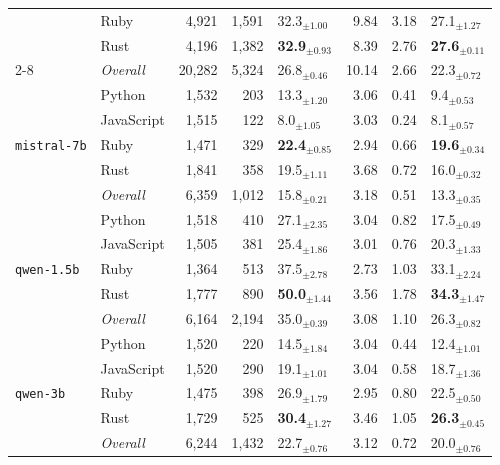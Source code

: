 \begin{longtable}{@{}llrrp{0.72cm}rrp{0.72cm}@{}}
       & Ruby & 4,921 & 1,591 & 32.3$_{\pm 1.00}$ & 9.84 & 3.18 & 27.1$_{\pm 1.27}$ \\
       & Rust & 4,196 & 1,382 & \textbf{32.9$_{\pm 0.93}$} & 8.39 & 2.76 & \textbf{27.6$_{\pm 0.11}$} \\ \cmidrule(lr){2-8}
      & \textit{Overall} & 20,282 & 5,324 & 26.8$_{\pm 0.46}$ & 10.14 & 2.66 & 22.3$_{\pm 0.72}$ \\
    \midrule
      \multirow{5}{*}{\texttt{mistral-7b}} & Python & 1,532 & 203 & 13.3$_{\pm 1.20}$ & 3.06 & 0.41 & 9.4$_{\pm 0.53}$ \\
       & JavaScript & 1,515 & 122 & 8.0$_{\pm 1.05}$ & 3.03 & 0.24 & 8.1$_{\pm 0.57}$ \\
       & Ruby & 1,471 & 329 & \textbf{22.4$_{\pm 0.85}$} & 2.94 & 0.66 & \textbf{19.6$_{\pm 0.34}$} \\
       & Rust & 1,841 & 358 & 19.5$_{\pm 1.11}$ & 3.68 & 0.72 & 16.0$_{\pm 0.32}$ \\ \cmidrule(lr){2-8}
      & \textit{Overall} & 6,359 & 1,012 & 15.8$_{\pm 0.21}$ & 3.18 & 0.51 & 13.3$_{\pm 0.35}$ \\
    \midrule
      \multirow{5}{*}{\texttt{qwen-1.5b}} & Python & 1,518 & 410 & 27.1$_{\pm 2.35}$ & 3.04 & 0.82 & 17.5$_{\pm 0.49}$ \\
       & JavaScript & 1,505 & 381 & 25.4$_{\pm 1.86}$ & 3.01 & 0.76 & 20.3$_{\pm 1.33}$ \\
       & Ruby & 1,364 & 513 & 37.5$_{\pm 2.78}$ & 2.73 & 1.03 & 33.1$_{\pm 2.24}$ \\
       & Rust & 1,777 & 890 & \textbf{50.0$_{\pm 1.44}$} & 3.56 & 1.78 & \textbf{34.3$_{\pm 1.47}$} \\ \cmidrule(lr){2-8}
      & \textit{Overall} & 6,164 & 2,194 & 35.0$_{\pm 0.39}$ & 3.08 & 1.10 & 26.3$_{\pm 0.82}$ \\
    \midrule
      \multirow{5}{*}{\texttt{qwen-3b}} & Python & 1,520 & 220 & 14.5$_{\pm 1.84}$ & 3.04 & 0.44 & 12.4$_{\pm 1.01}$ \\
       & JavaScript & 1,520 & 290 & 19.1$_{\pm 1.01}$ & 3.04 & 0.58 & 18.7$_{\pm 1.36}$ \\
       & Ruby & 1,475 & 398 & 26.9$_{\pm 1.79}$ & 2.95 & 0.80 & 22.5$_{\pm 0.50}$ \\
       & Rust & 1,729 & 525 & \textbf{30.4$_{\pm 1.27}$} & 3.46 & 1.05 & \textbf{26.3$_{\pm 0.45}$} \\ \cmidrule(lr){2-8}
      & \textit{Overall} & 6,244 & 1,432 & 22.7$_{\pm 0.76}$ & 3.12 & 0.72 & 20.0$_{\pm 0.76}$ \\

\end{longtable}
